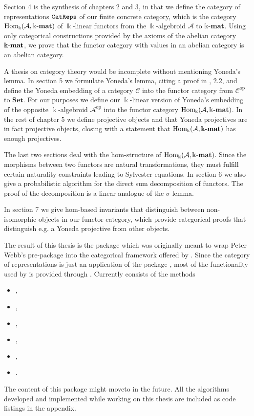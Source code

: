 Section 4 is the synthesis of chapters 2 and 3, in that we define the category of representations $\texttt{CatReps}$
of our finite concrete category, which is the category $\mathrm{Hom_{\Bbbk}}(\mathcal{A},\Bbbk\textnormal{-}\mathbf{mat})$ of $\Bbbk$-linear functors from the $\Bbbk$-algebroid
$\mathcal{A}$ to $\Bbbk\textnormal{-}\mathbf{mat}$. Using only categorical constructions provided by the axioms of the abelian category $\Bbbk\textnormal{-}\mathbf{mat}$, we prove that
the functor category with values in an abelian category is an abelian category.

A thesis on category theory would be incomplete without mentioning Yoneda's lemma. In section 5 we
formulate Yoneda's lemma, citing a proof in \cite{[context]}, 2.2, and define the Yoneda embedding of a category $\mathcal{C}$ into the
functor category from $\mathcal{C}^{\text{op}}$ to $\mathbf{Set}$. For our purposes we
define our $\Bbbk$-linear version of Yoneda's embedding of the opposite $\Bbbk$-algebroid $\mathcal{A}^{\text{op}}$
into the functor category $\mathrm{Hom_{\Bbbk}}(\mathcal{A},\Bbbk\textnormal{-}\mathbf{mat})$. In the rest of chapter 5 we define projective objects and that
Yoneda projectives are in fact projective objects, closing with a statement that $\mathrm{Hom_{\Bbbk}}(\mathcal{A},\Bbbk\textnormal{-}\mathbf{mat})$ has enough projectives.

The last two sections deal with the hom-structure of $\mathrm{Hom_{\Bbbk}}(\mathcal{A},\Bbbk\textnormal{-}\mathbf{mat})$. Since the morphisms between two
functors are natural transformations, they must fulfill certain naturality constraints leading to Sylvester equations. 
In section 6 we also give a probabilistic algorithm for the direct sum decomposition of functors. The proof of the decomposition is a linear
analogue of the $\sigma$ lemma.

In section 7 we give hom-based invariants that distinguish between non-isomorphic objects in our functor category, which provide 
categorical proofs that distinguish e.g. a Yoneda projective from other objects.

The result of this thesis is the \Gap package \CatReps which was originally meant to wrap Peter Webb's
pre-package \catreps into the categorical framework offered by \CAP. Since the category of representations is just an application of the package
\FunctorCategories, most of the functionality used by \CatReps is provided through \FunctorCategories.
Currently \CatReps consists of the methods
\begin{itemize}
\item {},
\item {},
\item {},
\item {},
\item {},
\item {}.
\end{itemize}
The content of this package might moveto \FunctorCategories in the future. All the algorithms developed and implemented while working on this
thesis are included as code listings in the appendix.
